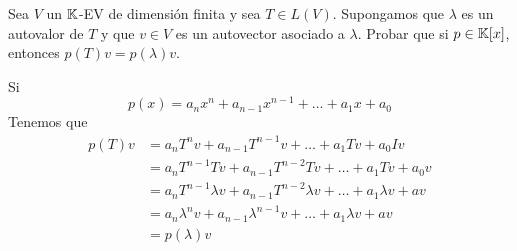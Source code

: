 \item Sea $V$ un $\mathbb{K}$-EV de dimensión finita y sea $T\in L(V)$. Supongamos que $\lambda$ es un autovalor de $T$ y que $v\in V$ es un autovector asociado a $\lambda$. Probar que si $p\in\mathbb{K}[x]$, entonces $p(T)v=p(\lambda)v$.
    \begin{mdframed}[style=s]
        Si
        \[p(x)=a_nx^n+a_{n-1}x^{n-1}+\dots+a_1x+a_0\]
        Tenemos que
        \begin{align*}
            p(T)v&=a_nT^nv+a_{n-1}T^{n-1}v+\dots+a_1Tv+a_0Iv\\
            &=a_nT^{n-1}Tv+a_{n-1}T^{n-2}Tv+\dots+a_1Tv+a_0v\\
            &=a_nT^{n-1}\lambda v+a_{n-1}T^{n-2}\lambda v+\dots+a_1\lambda v+av\\
            &=a_n\lambda^nv+a_{n-1}\lambda^{n-1}v+\dots+a_1\lambda v+av\\
            &=p(\lambda)v
        \end{align*}
    \end{mdframed}